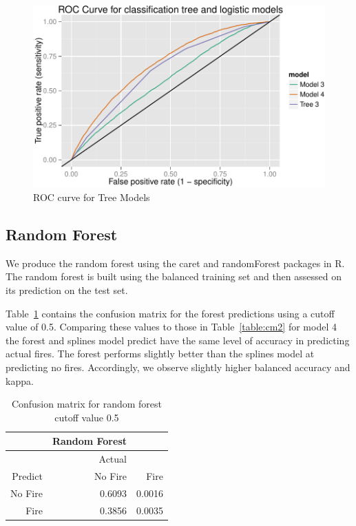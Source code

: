 \documentclass[11pt,a4paper]{article}
\begin{document}
\begin{figure}
  \centering
	\includegraphics[width=.8\textwidth]{figures/trees_roc.pdf}
  \caption{ROC curve for Tree Models}
  \label{fig:troc}
\end{figure}


\subsection{Random Forest}

We produce the random forest using the caret and randomForest packages \citep{caret, rf} in R. The random forest is built using the balanced training set and then assessed on its prediction on the test set.

Table~\ref{table:cmrf} contains the confusion matrix for the forest predictions using a cutoff value of 0.5. Comparing these values to those in Table~\ref{table:cm2} for model 4 the forest and splines model predict have the same level of accuracy in predicting actual fires. The forest performs slightly better than the splines model at predicting no fires. Accordingly, we observe slightly higher balanced accuracy and kappa.

\begin{table}
  \centering
  \begin{tabular}{rrr}
    \toprule
            & Random Forest & \\
    \midrule
            & Actual        & \\
    Predict & No Fire       & Fire \\
    \midrule
    No Fire & 0.6093        & 0.0016 \\
    Fire    & 0.3856        & 0.0035 \\
    \bottomrule
  \end{tabular}
  \caption{Confusion matrix for random forest cutoff value 0.5}
  \label{table:cmrf}
\end{table}
\end{document}
